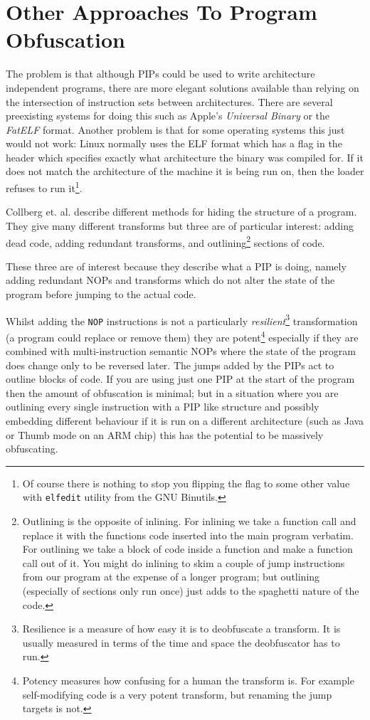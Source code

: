 \documentclass[10pt,]{book}
\begin{document}
\section{Other Approaches To Program Obfuscation}

The problem is that although PIPs could be used to write architecture
independent programs, there are more elegant solutions available than
relying on the intersection of instruction sets between architectures.
There are several preexisting systems for doing this such as Apple's
\emph{Universal Binary} or the \emph{FatELF}\autocite{Icculus:vl}
format. Another problem is that for some operating systems this just
would not work: Linux normally uses the ELF format\autocite{mancx:th}
which has a flag in the header which specifies exactly what architecture
the binary was compiled for. If it does not match the architecture of
the machine it is being run on, then the loader refuses to run
it\footnote{Of course there is nothing to stop you flipping the flag to
  some other value with \lstinline!elfedit! utility from the GNU
  Binutils.}.

Collberg et. al. \autocite{Collberg:1997vt} describe different methods
for hiding the structure of a program. They give many different
transforms but three are of particular interest: adding dead code,
adding redundant transforms, and outlining\footnote{Outlining is the
  opposite of inlining. For inlining we take a function call and replace
  it with the functions code inserted into the main program verbatim.
  For outlining we take a block of code inside a function and make a
  function call out of it. You might do inlining to skim a couple of
  jump instructions from our program at the expense of a longer program;
  but outlining (especially of sections only run once) just adds to the
  spaghetti nature of the code.} sections of code.

These three are of interest because they describe what a PIP is doing,
namely adding redundant NOPs and transforms which do not alter the state
of the program before jumping to the actual code.

Whilst adding the \lstinline!NOP! instructions is not a particularly
\emph{resilient}\footnote{Resilience is a measure of how easy it is to
  deobfuscate a transform. It is usually measured in terms of the time
  and space the deobfuscator has to run.} transformation (a program
could replace or remove them) they are potent\footnote{Potency measures
  how confusing for a human the transform is. For example self-modifying
  code is a very potent transform, but renaming the jump targets is not.}
especially if they are combined with multi-instruction semantic NOPs
where the state of the program does change only to be reversed later.
The jumps added by the PIPs act to outline blocks of code. If you are
using just one PIP at the start of the program then the amount of
obfuscation is minimal; but in a situation where you are outlining every
single instruction with a PIP like structure and possibly embedding
different behaviour if it is run on a different architecture (such as
Java or Thumb mode on an ARM chip) this has the potential to be
massively obfuscating.
\end{document}
